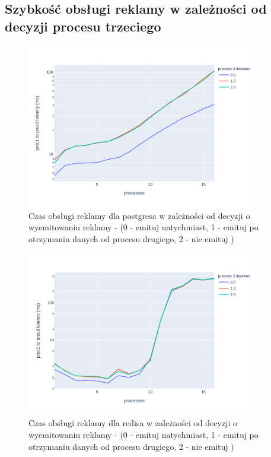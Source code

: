 \documentclass[10pt]{article}
\begin{document}
\subsection*{Szybkość obsługi reklamy w zależności od decyzji procesu trzeciego}

\begin{figure}[H]
    \centering
    \includegraphics[width=0.9\textwidth]{./graphs/proc_type_postgres.png}
    \caption{Czas obsługi reklamy dla postgresa w zależności od decyzji o wyemitowaniu reklamy - (0 - emituj natychmiast, 1 - emituj po otrzymaniu danych od procesu drugiego, 2 - nie emituj )}
\end{figure}

\begin{figure}[H]
    \centering
    \includegraphics[width=0.9\textwidth]{./graphs/proc_type_redis.png}
    \caption{Czas obsługi reklamy dla redisa w zależności od decyzji o wyemitowaniu reklamy - (0 - emituj natychmiast, 1 - emituj po otrzymaniu danych od procesu drugiego, 2 - nie emituj )}
\end{figure}
\end{document}
